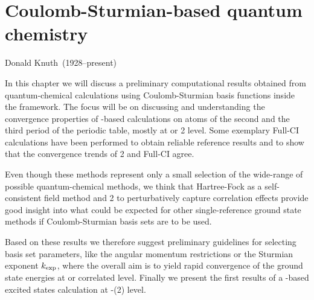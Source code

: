 \chapter{Coulomb-Sturmian-based quantum chemistry}
\label{ch:CSQChem}
{Donald Knuth~(1928--present)}

\newcommand{\limp}{l_\text{imp}}

\noindent
In this chapter we will discuss a preliminary computational results
obtained from quantum-chemical calculations using Coulomb-Sturmian
basis functions inside the \molsturm framework.
The focus will be on discussing and understanding the convergence
properties of \CS-based calculations on atoms of
the second and the third period of the periodic table,
mostly at \HF or {\MP}2 level.
Some exemplary Full-CI calculations have been performed
to obtain reliable reference results
and to show that the convergence trends of {\MP}2 and Full-CI agree.

Even though these methods represent only a small selection
of the wide-range of possible quantum-chemical methods,
we think that Hartree-Fock as a self-consistent field method
and {\MP}2 to perturbatively capture correlation effects
provide good insight into what could be expected
for other single-reference ground state methods
if Coulomb-Sturmian basis sets are to be used.

Based on these results we therefore suggest
preliminary guidelines for selecting \CS basis set parameters,
like the angular momentum restrictions or the Sturmian exponent $k_\text{exp}$,
where the overall aim is to yield rapid convergence
of the ground state energies at \HF or correlated level.
Finally we present the first results of a \CS-based
excited states calculation at \ADC-(2) level.








